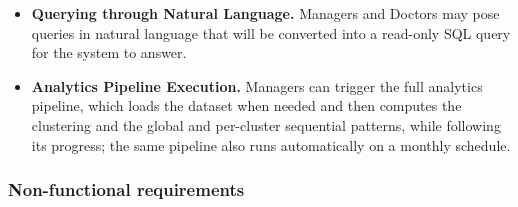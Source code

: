 \begin{itemize}
    \item \textbf{Querying through Natural Language.} Managers and Doctors may pose queries in natural language that will be converted into a read-only SQL query for the system to answer.
    \item \textbf{Analytics Pipeline Execution.} Managers can trigger the full analytics pipeline, which loads the dataset when needed and then computes the clustering and the global and per-cluster sequential patterns, while following its progress; the same pipeline also runs automatically on a monthly schedule.
\end{itemize}

\subsubsection*{Non-functional requirements}
